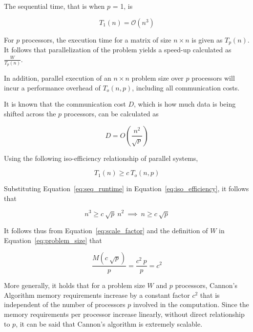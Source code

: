 \documentclass[fleqn,10pt]{SelfArx} %
\begin{document}
The sequential time, that is when $p$ = 1, is 

\begin{equation}
	T_1(n) = \mathcal{O}(n^3)
	\label{eq:seq_runtime}
\end{equation}

For $p$ processors, the execution time for a matrix of size $n \times n$ is given as $T_p (n)$. It follows that parallelization of the problem yields a speed-up calculated as $\frac{W}{T_p (n)}$. 

In addition, parallel execution of an $n \times n$ problem size over $p$ processors will incur a performance overhead of $T_o(n, p)$, including all communication costs. 

It is known that the communication cost $D$, which is how much data is being shifted across the $p$ processors, can be calculated as 

\begin{equation}
	D = O(\frac{n^2}{\sqrt{p}})
\end{equation}

\noindent Using the following iso-efficiency relationship of parallel systems,  

\begin{equation}
	T_1(n) \geq c \ T_o(n, p)
	\label{eq:iso_efficiency}
\end{equation}

\noindent Substituting Equation~\eqref{eq:seq_runtime} in Equation~\eqref{eq:iso_efficiency}, it follows that

\begin{equation}
	n^3 \geq c \ \sqrt{p} \ n^2 \ \implies \ n \geq c \ \sqrt{p}
	\label{eq:scale_factor}
\end{equation}

\noindent It follows thus from Equation~\eqref{eq:scale_factor} and the definition of $W$ in Equation~\eqref{eq:problem_size} that

\begin{equation}
	\frac{M(c \ \sqrt{p})}{p} = \frac{c^2 \ p}{p} = c^2
\end{equation}

More generally, it holds that for a problem size $W$ and $p$ processors, Cannon's Algorithm memory requirements increase by a constant factor $c^2$ that is independent of the number of processors $p$ involved in the computation.  Since the memory requirements per processor increase linearly, without direct relationship to $p$, it can be said that Cannon's algorithm is extremely scalable. 
\end{document}
